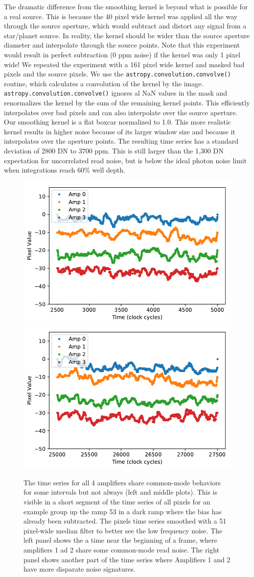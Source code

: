\documentclass[]{aastex62}
\begin{document}
The dramatic difference from the smoothing kernel is beyond what is possible for a real source.
This is because the 40 pixel wide kernel was applied all the way through the source aperture, which would subtract and distort any signal from a star/planet source.
In reality, the kernel should be wider than the source aperture diameter and interpolate through the source points.
Note that this experiment would result in perfect subtraction (0 ppm noise) if the kernel was only 1 pixel wide!
We repeated the experiment with a 161 pixel wide kernel and masked bad pixels and the source pixels.
We use the \texttt{astropy.convolution.convolve()} routine, which calculates a convolution of the kernel by the image.
\texttt{astropy.convolution.convolve()} ignores al NaN values in the mask and renormalizes the kernel by the sum of the remaining kernel points.
This efficiently interpolates over bad pixels and can also interpolate over the source aperture.
Our smoothing kernel is a flat boxcar normalized to 1.0.
This more realistic kernel results in higher noise because of its larger window size and because it interpolates over the aperture points.
The resulting time series has a standard deviation of 2800 DN to 3700 ppm.
This is still larger than the 1,300 DN expectation for uncorrelated read noise, but is below the ideal photon noise limit when integrations reach 60\% well depth.


\begin{figure}[!hbtp]
\centering
\includegraphics[width=.32\columnwidth]{pixeltime_series_0.pdf}
\includegraphics[width=.32\columnwidth]{pixeltime_series_1.pdf}
\caption{The time series for all 4 amplifiers share common-mode behaviors for some intervals but not always (left and middle plots).
This is visible in a short segment of the time series of all pixels for an example group up the ramp 53 in a dark ramp where the bias has already been subtracted.
The pixels time series smoothed with a 51 pixel-wide median filter to better see the low frequency noise.
The left panel shows the a time near the beginning of a frame, where amplifiers 1 ad 2 share some common-mode read noise.
The right panel shows another part of the time series where Amplifiers 1 and 2 have more disparate noise signatures.
}\label{fig:darkPixelTimeSeries}
\end{figure}
\end{document}
